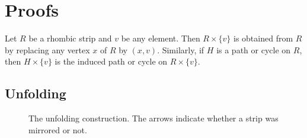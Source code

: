 \documentclass[fontsize=11pt,a4paper,DIV=12]{scrartcl}
\begin{document}
\section{Proofs}\label{sec:proofs}

Let $R$ be a rhombic strip and $v$ be any element. Then $R\times\{v\}$ is obtained from $R$ by replacing any vertex $x$ of $R$ by $(x,v)$. Similarly, if $H$ is a path or cycle on $R$, then $H\times\{v\}$ is the induced path or cycle on $R\times\{v\}$.

\subsection{Unfolding}

\begin{figure}[!ht]
	\centering
	
	\caption{The unfolding construction. The arrows indicate whether a strip was mirrored or not.}
	\label{fig:unfolding}
\end{figure}
\end{document}

